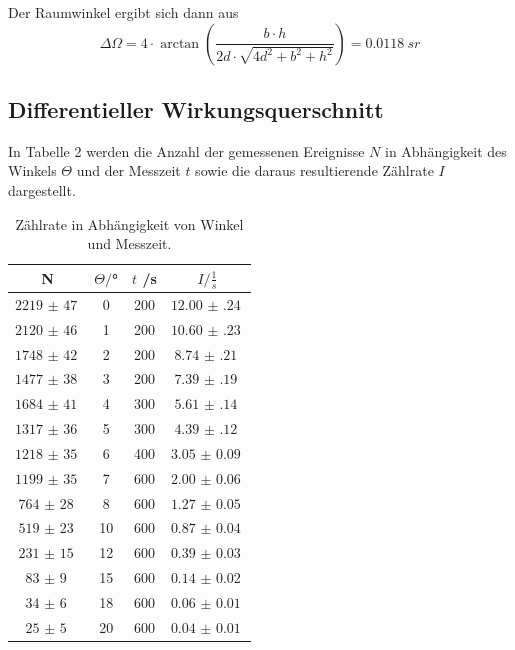 Der Raumwinkel ergibt sich dann aus \cite{sample2}
\begin{equation}
  \Delta \Omega = 4 \cdot \arctan\left(\frac{b \cdot h}{2d \cdot \sqrt{4d^2 + b^2 + h^2}}\right) = \SI{0.0118}{sr}
\end{equation}


\subsection{Differentieller Wirkungsquerschnitt}
\label{sec:wq}
In Tabelle 2 werden die Anzahl der gemessenen Ereignisse $N$ in Abhängigkeit des Winkels $\Theta$ und der Messzeit $t$
sowie die daraus resultierende Zählrate $I$ dargestellt.


\begin{table}[H]
  \centering
  \caption{Zählrate in Abhängigkeit von Winkel und Messzeit.}
  \label{tab:Parameter}
  \begin{tabular}{c c c c}
    \toprule
    N & $\Theta/$° & $t$ /s & $I / \frac{1}{s}$\\
    \midrule
    $\SI{2219(47)}{}$ &  0 & 200 & $\SI{12.00(24)}{}$ \\
    $\SI{2120(46)}{}$ &  1 & 200 & $\SI{10.60(23)}{}$ \\
    $\SI{1748(42)}{}$ &  2 & 200 & $\SI{8.74(21)}{}$ \\
    $\SI{1477(38)}{}$ &  3 & 200 & $\SI{7.39(19)}{}$ \\
    $\SI{1684(41)}{}$ &  4 & 300 & $\SI{5.61(14)}{}$ \\
    $\SI{1317(36)}{}$ &  5 & 300 & $\SI{4.39(12)}{}$ \\
    $\SI{1218(35)}{}$ &  6 & 400 & $\SI{3.05(9)}{}$ \\
    $\SI{1199(35)}{}$ &  7 & 600 & $\SI{2.00(6)}{}$ \\
    $\SI{764(28)}{}$  &  8 & 600 & $\SI{1.27(5)}{}$ \\
    $\SI{519(23)}{}$  & 10 & 600 & $\SI{0.87(4)}{}$ \\
    $\SI{231(15)}{}$  & 12 & 600 & $\SI{0.39(3)}{}$ \\
    $\SI{83(9)}{}$    & 15 & 600 & $\SI{0.14(2)}{}$ \\
    $\SI{34(6)}{}$    & 18 & 600 & $\SI{0.06(1)}{}$ \\
    $\SI{25(5)}{}$    & 20 & 600 & $\SI{0.04(1)}{}$ \\
    \bottomrule
  \end{tabular}
\end{table}

